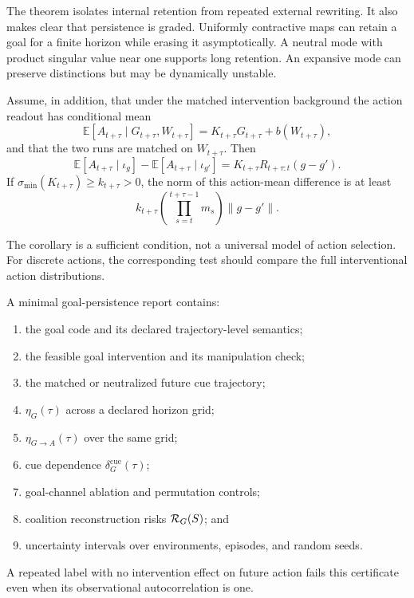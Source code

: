 The theorem isolates internal retention from repeated external rewriting. It
also makes clear that persistence is graded. Uniformly contractive maps can
retain a goal for a finite horizon while erasing it asymptotically. A neutral
mode with product singular value near one supports long retention. An
expansive mode can preserve distinctions but may be dynamically unstable.

\begin{corollary}
\label{cor:goal-action-readout}
Assume, in addition, that under the matched intervention background the action
readout has conditional mean
\[
\mathbb E[A_{t+\tau}\mid G_{t+\tau},W_{t+\tau}]
=
K_{t+\tau}G_{t+\tau}+b(W_{t+\tau}),
\]
and that the two runs are matched on \(W_{t+\tau}\). Then
\[
\mathbb E[A_{t+\tau}\mid\iota_g]
-
\mathbb E[A_{t+\tau}\mid\iota_{g'}]
=
K_{t+\tau}R_{t+\tau:t}(g-g').
\]
If \(\sigma_{\min}(K_{t+\tau})\geq k_{t+\tau}>0\), the norm of this action-mean
difference is at least
\[
k_{t+\tau}
\left(
\prod_{s=t}^{t+\tau-1}m_s
\right)
\|g-g'\|.
\]
\end{corollary}

The corollary is a sufficient condition, not a universal model of action
selection. For discrete actions, the corresponding test should compare the
full interventional action distributions.


A minimal goal-persistence report contains:
\begin{enumerate}
\item the goal code and its declared trajectory-level semantics;
\item the feasible goal intervention and its manipulation check;
\item the matched or neutralized future cue trajectory;
\item \(\eta_G(\tau)\) across a declared horizon grid;
\item \(\eta_{G\to A}(\tau)\) over the same grid;
\item cue dependence \(\delta_G^{\mathrm{cue}}(\tau)\);
\item goal-channel ablation and permutation controls;
\item coalition reconstruction risks \(\mathcal R_G(S)\); and
\item uncertainty intervals over environments, episodes, and random seeds.
\end{enumerate}
A repeated label with no intervention effect on future action fails this
certificate even when its observational autocorrelation is one.

